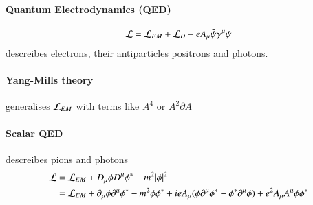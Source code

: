 \paragraph{Quantum Electrodynamics (QED)}
\begin{align*}
	\mathcal{L} = \mathcal{L}_{EM} + \mathcal{L}_{D} - eA_\mu \bar{\psi} \gamma^\mu \psi
\end{align*}
descreibes electrons, their antiparticles positrons and photons.

\paragraph{Yang-Mills theory}
generalises $\mathcal{L}_{EM}$ with terms like $A^4$ or $A^2 \partial A$
\paragraph{Scalar QED}
descreibes pions and photons
\begin{align*}
	\begin{split}
		\mathcal{L} &= \mathcal{L}_{EM} + D_\mu \phi D^\mu\phi^* - m^2 |\phi|^2 \\
			 &= \mathcal{L}_{EM} + \partial_\mu\phi\partial^\mu\phi^* - m^2 \phi\phi^* + ie A_\mu(\phi\partial^\mu\phi^* - \phi^* \partial^\mu\phi) + e^2 A_\mu A^\mu \phi\phi^*
	\end{split}
\end{align*}
